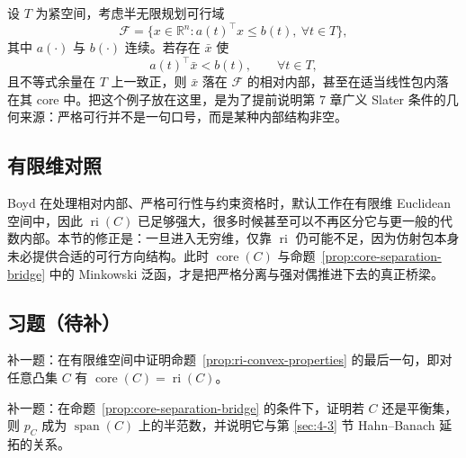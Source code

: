 \begin{example}\label{ex:semi-infinite-slater}
设 $T$ 为紧空间，考虑半无限规划可行域
\[
\mathcal F=\{x\in\mathbb R^n:a(t)^\top x\le b(t),\ \forall t\in T\},
\]
其中 $a(\cdot)$ 与 $b(\cdot)$ 连续。若存在 $\bar x$ 使
\[
a(t)^\top \bar x<b(t),\qquad \forall t\in T,
\]
且不等式余量在 $T$ 上一致正，则 $\bar x$ 落在 $\mathcal F$ 的相对内部，甚至在适当线性包内落在其 core 中。把这个例子放在这里，是为了提前说明第 7 章广义 Slater 条件的几何来源：严格可行并不是一句口号，而是某种内部结构非空。
\end{example}

\subsection*{有限维对照}

Boyd 在处理相对内部、严格可行性与约束资格时，默认工作在有限维 Euclidean 空间中，因此 $\operatorname{ri}(C)$ 已足够强大，很多时候甚至可以不再区分它与更一般的代数内部。本节的修正是：一旦进入无穷维，仅靠 $\operatorname{ri}$ 仍可能不足，因为仿射包本身未必提供合适的可行方向结构。此时 $\operatorname{core}(C)$ 与命题~\ref{prop:core-separation-bridge} 中的 Minkowski 泛函，才是把严格分离与强对偶推进下去的真正桥梁。

\subsection*{习题（待补）}

\begin{exercise}\label{exr:core-ri-placeholder}
补一题：在有限维空间中证明命题~\ref{prop:ri-convex-properties} 的最后一句，即对任意凸集 $C$ 有 $\operatorname{core}(C)=\operatorname{ri}(C)$。
\end{exercise}

\begin{exercise}\label{exr:minkowski-gauge-placeholder}
补一题：在命题~\ref{prop:core-separation-bridge} 的条件下，证明若 $C$ 还是平衡集，则 $p_C$ 成为 $\operatorname{span}(C)$ 上的半范数，并说明它与第 \ref{sec:4-3} 节 Hahn--Banach 延拓的关系。
\end{exercise}
